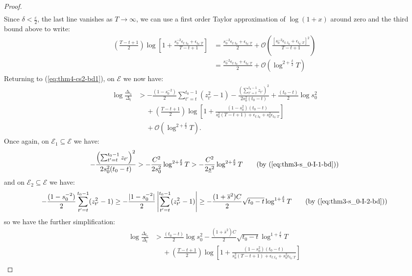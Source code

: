 \begin{proof}
\begin{align*}
\end{align*}
\normalsize
Since $\delta < \frac{\varepsilon}{2}$, the last line vanishes as $T \to \infty$, we can use a first order Taylor approximation of $\log(1+x)$ around zero and the third bound above to write: 
\begin{align*}
    \left(\frac{T - t +1}{2}\right)\log\left[1 + \frac{s_0^{-2} \epsilon_{t:t_0} + \epsilon_{t_0:T} }{T-t+1}\right] &= \frac{s_0^{-2}\epsilon_{t:t_0} + \epsilon_{t_0:T}}{2} + \mathcal{O}\left(\frac{[s_0^{-2} \epsilon_{t:t_0} + \epsilon_{t_0:T}]^2 }{T-t+1}\right) \\
    &= \frac{s_0^{-2}\epsilon_{t:t_0} + \epsilon_{t_0:T}}{2} + \mathcal{O}\left(\log^{2+\frac{\delta}{2}} T\right)
\end{align*}
Returning to (\ref{eq:thm4-cs2-bd1}), on $\mathcal{E}$ we now have:
\begin{align*}
    \log \frac{\Delta_{t_0}}{\Delta_t} &> - \frac{(1-s_0^{-2})}{2} \sum_{t' = t}^{t_0 - 1} (z_{t'}^2-1) - \frac{\left(\sum_{t'=t}^{t_0-1 } z_{t'}\right)^2}{2s_0^2(t_0-t)} + \frac{(t_0-t)}{2}\log s_0^2  \\
    &\quad\: + \left(\frac{T - t +1}{2}\right)\log\left[1 + \frac{(1 - s_0^2)(t_0 - t)}{s_0^{2}(T-t+1) + \epsilon_{t:t_0} + s_0^{2}\epsilon_{t_0:T} }\right]  \\
    &\quad\: +\mathcal{O}\left(\log^{2+\frac{\delta}{2}} T\right). 
\end{align*}
Once again, on $\mathcal{E}_1 \subseteq\mathcal{E}$ we have:
\begin{align*}
    - \frac{\left(\sum_{t'=t}^{t_0-1 } z_{t'}\right)^2}{2s_0^2(t_0-t)} > - \frac{C^2}{2s_0^2} \log^{2+\frac{\delta}{2}} T > - \frac{C^2}{2\underline{s}^2}\log^{2+\frac{\delta}{2}} T \tag{by (\ref{eq:thm3-s_0-I-1-bd})}
\end{align*}
and on $\mathcal{E}_2 \subseteq\mathcal{E}$ we have: 
\begin{align*}
    - \frac{(1-s_0^{-2})}{2} \sum_{t' = t}^{t_0 - 1} (z_{t'}^2-1) \geq - \frac{|1-s_0^{-2}|}{2} \left|\sum_{t' = t}^{t_0 - 1} (z_{t'}^2-1)\right| \geq - \frac{(1  +\overline{s}^2)C}{2}\sqrt{t_0-t}\log^{1+\frac{\delta}{4}}T \tag{by (\ref{eq:thm3-s_0-I-2-bd})}
\end{align*}
so we have the further simplification:
\begin{align*}
    \log \frac{\Delta_{t_0}}{\Delta_t} &> \frac{(t_0-t)}{2}\log s_0^2  - \frac{(1  +\overline{s}^2)C}{2}\sqrt{t_0-t}\log^{1+\frac{\delta}{4}}T  \\
    &\quad\: + \left(\frac{T - t +1}{2}\right)\log\left[1 + \frac{(1 - s_0^2)(t_0 - t)}{s_0^{2}(T-t+1) + \epsilon_{t:t_0} + s_0^{2}\epsilon_{t_0:T} }\right]  \\

\end{align*}
\end{proof}
